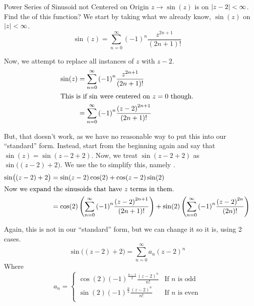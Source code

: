 \begin{example}{Power Series of Sinusoid not Centered on Origin}
  $z \to \sin(z)$ is  on $\left\lvert z-2 \right\rvert < \infty$.
  Find the  of this function?
  \tcblower{}
  We start by taking what we already know, $\sin(z)$ on $\left\lvert z \right\rvert < \infty$.
  \begin{equation*}
    \sin(z) = \sum_{n=0}^{\infty} {(-1)}^{n} \frac{z^{2n+1}}{(2n+1)!}
  \end{equation*}

  Now, we attempt to replace all instances of $z$ with $z-2$.
  \begin{align*}
    \sin(z) &= \sum_{n=0}^{\infty} {(-1)}^{n} \frac{z^{2n+1}}{(2n+1)!} \\
    \shortintertext{This is if $\sin$ were centered on $z=0$ though.}
            &= \sum_{n=0}^{\infty} {(-1)}^{n} \frac{{(z-2)}^{2n+1}}{(2n+1)!}
  \end{align*}

  But, that doesn't work, as we have no reasonable way to put this into our ``standard''  form.
  Instead, start from the beginning again and say that $\sin(z) = \sin(z - 2 + 2)$.
  Now, we treat $\sin(z-2+2)$ as $\sin \bigl( (z-2) + 2 \bigr)$.
  We use the  to simplify this, namely .
  \begin{align*}
    \sin \bigl( (z-2) + 2 \bigr) &= \sin(z-2) \cos(2) + \cos(z-2) \sin(2) \\
    \shortintertext{Now we expand the sinusoids that have $z$ terms in them.}
                                 &= \cos(2) \left( \sum_{n=0}^{\infty} {(-1)}^{n} \frac{{(z-2)}^{2n+1}}{(2n+1)!} \right) + \sin(2) \left( \sum_{n=0}^{\infty} {(-1)}^{n} \frac{{(z-2)}^{2n}}{(2n)!} \right) \\
  \end{align*}

  Again, this is not in our ``standard'' form, but we can change it so it is, using 2 cases.
  \begin{equation*}
    \sin \bigl( (z-2) + 2 \bigr) = \sum_{n=0}^{\infty} a_{n} {(z-2)}^{n}
  \end{equation*}
  Where
  \begin{equation*}
    a_{n} =
    \begin{cases}
      \cos(2) {(-1)}^{\frac{n-1}{2}} \frac{{(z-2)}^{n}}{n!} & \text{If $n$ is odd} \\[5pt]

      \sin(2) {(-1)}^{\frac{n}{2}} \frac{{(z-2)}^{n}}{n!} & \text{If $n$ is even} \\
    \end{cases}
  \end{equation*}
\end{example}

